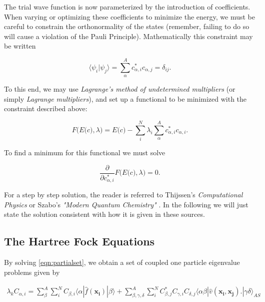 The trial wave function is now parameterized by the introduction of coefficients. When varying or optimizing these coefficients to minimize the energy, we must be careful to constrain the orthonormality of the states (remember, failing to do so will cause a violation of the Pauli Principle). Mathematically this constraint may be written

\begin{equation}
\langle \psi_i \vert \psi_j \rangle = \sum_{\alpha}^A c_{\alpha, i}^*c_{\alpha, j} = \delta_{ij}.
\label{eqn:orthonormality}
\end{equation}

To this end, we may use \emph{Lagrange's method of undetermined multipliers} \cite[p.116]{Szabo} (or simply  \emph{Lagrange multipliers}), and set up a functional to be minimized with the constraint described above:

\begin{equation}
 F\big( E\big( c \big), \lambda \big) = E\big( c \big) - \sum _i^N \lambda _i \sum _{\alpha}^A c_{\alpha,i}^{*} c_{\alpha,i}.
 \label{lagrange_minim}
\end{equation}

To find a minimum for this functional we must solve

\begin{equation}
\frac{\partial}{\partial c_{\alpha,i}^{*}} F\big( E\big( c \big), \lambda \big) = 0.
\label{eqn:partialset}
\end{equation}

For a step by step solution, the reader is referred to Thijssen's \emph{Computational Physics} \cite{Thijssen} or Szabo's \emph{"Modern Quantum Chemistry"} \cite{Szabo}. In the following we will just state the solution consistent with how it is given in these sources.

\subsection{The Hartree Fock Equations}

By solving \ref{eqn:partialset}, we obtain a set of coupled one particle eigenvalue problems given by

\begin{multline}
\lambda _k C_{\alpha,i} =  
\sum _{\beta}^A\sum _{i}^N C_{\beta,i}\langle \alpha |\hat{f}(\mathbf{x_i}) | \beta \rangle + 
\sum _{\beta,\gamma,\delta}^A \sum _i^N C_{\beta,j}^{*}C_{\gamma,i}C_{\delta,j}\langle \alpha \beta |\hat{v}(\mathbf{x_i},\mathbf{x_j}) .|\gamma \delta \rangle _{AS}
 \label{eqn:HF1}
\end{multline}

